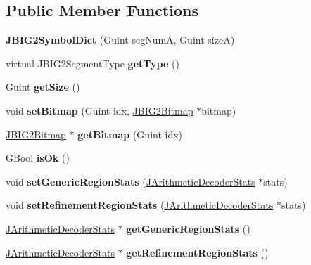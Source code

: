 \subsection*{Public Member Functions}
\begin{DoxyCompactItemize}
\item 
\mbox{\label{class_j_b_i_g2_symbol_dict_a8577decf878d115eb988f1582b2c68aa}} 
{\bfseries J\+B\+I\+G2\+Symbol\+Dict} (Guint seg\+NumA, Guint sizeA)
\item 
\mbox{\label{class_j_b_i_g2_symbol_dict_a662cd55eb92839b9ec1a3ce279a13725}} 
virtual J\+B\+I\+G2\+Segment\+Type {\bfseries get\+Type} ()
\item 
\mbox{\label{class_j_b_i_g2_symbol_dict_a4233e46ee3ce9817d5bf8952f92cd55d}} 
Guint {\bfseries get\+Size} ()
\item 
\mbox{\label{class_j_b_i_g2_symbol_dict_ac80cace92fdea435a366dfb13910d27e}} 
void {\bfseries set\+Bitmap} (Guint idx, \hyperlink{class_j_b_i_g2_bitmap}{J\+B\+I\+G2\+Bitmap} $\ast$bitmap)
\item 
\mbox{\label{class_j_b_i_g2_symbol_dict_afd301752394e9e8061559f768ccea4ff}} 
\hyperlink{class_j_b_i_g2_bitmap}{J\+B\+I\+G2\+Bitmap} $\ast$ {\bfseries get\+Bitmap} (Guint idx)
\item 
\mbox{\label{class_j_b_i_g2_symbol_dict_a0ba1183179470638b57fe68447351373}} 
G\+Bool {\bfseries is\+Ok} ()
\item 
\mbox{\label{class_j_b_i_g2_symbol_dict_a09debab8e32e3c6c245b1b96987d161a}} 
void {\bfseries set\+Generic\+Region\+Stats} (\hyperlink{class_j_arithmetic_decoder_stats}{J\+Arithmetic\+Decoder\+Stats} $\ast$stats)
\item 
\mbox{\label{class_j_b_i_g2_symbol_dict_a3eb03309742b60ddded8b7ccc86d21be}} 
void {\bfseries set\+Refinement\+Region\+Stats} (\hyperlink{class_j_arithmetic_decoder_stats}{J\+Arithmetic\+Decoder\+Stats} $\ast$stats)
\item 
\mbox{\label{class_j_b_i_g2_symbol_dict_a4a9c1f8a12ee400fc9c142cd30587fdc}} 
\hyperlink{class_j_arithmetic_decoder_stats}{J\+Arithmetic\+Decoder\+Stats} $\ast$ {\bfseries get\+Generic\+Region\+Stats} ()
\item 
\mbox{\label{class_j_b_i_g2_symbol_dict_aa7bcd688b8c24af36827c72a28ebfb9d}} 
\hyperlink{class_j_arithmetic_decoder_stats}{J\+Arithmetic\+Decoder\+Stats} $\ast$ {\bfseries get\+Refinement\+Region\+Stats} ()
\end{DoxyCompactItemize}


